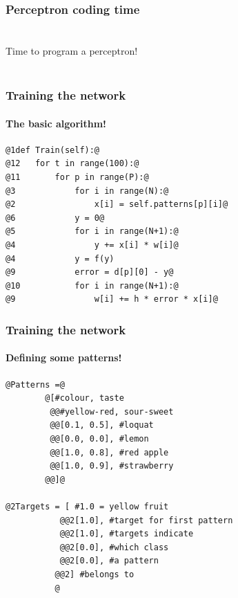 \documentclass{beamer}
\begin{document}
\begin{frame}
\frametitle{Perceptron coding time}
\framesubtitle{}
        \  \\


 \Huge Time to program a perceptron!
 \   \\  \   \\ 

\end{frame}

\begin{frame}[fragile]
\frametitle{Training the network}
\framesubtitle{The basic algorithm!}
\begin{lstlisting}[style=base]
@1def Train(self):@          
@12   for t in range(100):@
@11       for p in range(P):@     
@3            for i in range(N):@
@2                x[i] = self.patterns[p][i]@
@6            y = 0@
@5            for i in range(N+1):@
@4                y += x[i] * w[i]@
@4            y = f(y)
@9            error = d[p][0] - y@
@10           for i in range(N+1):@
@9                w[i] += h * error * x[i]@
\end{lstlisting}

\end{frame}
\begin{frame}[fragile]
\frametitle{Training the network}
\framesubtitle{Defining some patterns!}
\begin{lstlisting}[style=base]
@Patterns =@
        @[#colour, taste
         @@#yellow-red, sour-sweet
         @@[0.1, 0.5], #loquat 
         @@[0.0, 0.0], #lemon 
         @@[1.0, 0.8], #red apple 
         @@[1.0, 0.9], #strawberry 
        @@]@

@2Targets = [ #1.0 = yellow fruit
           @@2[1.0], #target for first pattern
           @@2[1.0], #targets indicate 
           @@2[0.0], #which class
           @@2[0.0], #a pattern         
          @@2] #belongs to           
          @

\end{lstlisting}

\end{frame}
\end{document}
